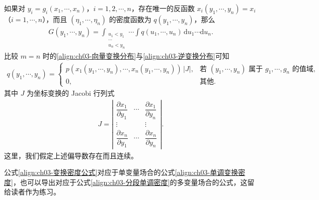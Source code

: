 \documentclass[../../main.tex]{subfiles}
\begin{document}
如果对 $y_i=g_i(x_1,\cdots,x_n)$，$i=1,2,\cdots,n$，存在唯一的反函数 $x_i(y_1,\cdots,y_n)=x_i$（$i=1,\cdots,n$），而且 $(\eta_1,\cdots,\eta_n)$ 的密度函数为 $q(y_1,\cdots,y_n)$，那么
\begin{align}
G(y_1,\cdots,y_n)=\int_{\substack{u_1<y_1\\\cdots\\u_n<y_n}}\cdots\int q(u_1,\cdots,u_n)\,\mathrm{d}u_1\cdots\mathrm{d}u_n.\label{align:ch03-逆变换分布}
\end{align}
比较 $m=n$ 时的\eqref{align:ch03-向量变换分布}与\eqref{align:ch03-逆变换分布}可知
\begin{align}
q(y_1,\cdots,y_n)=
\begin{cases}
p(x_1(y_1,\cdots,y_n),\cdots,x_n(y_1,\cdots,y_n))\,|J|, & \text{若 }(y_1,\cdots,y_n)\text{ 属于 }g_1,\cdots,g_n\text{ 的值域},\\
0, & \text{其他}.
\end{cases}\label{align:ch03-变换密度公式}
\end{align}
其中 $J$ 为坐标变换的 Jacobi 行列式
\begin{align}
J=\left|\begin{array}{ccc}
\dfrac{\partial x_1}{\partial y_1} & \cdots & \dfrac{\partial x_1}{\partial y_n}\\
\vdots & & \vdots\\
\dfrac{\partial x_n}{\partial y_1} & \cdots & \dfrac{\partial x_n}{\partial y_n}
\end{array}\right|.\label{align:ch03-Jacobi}
\end{align}
这里，我们假定上述偏导数存在而且连续。

公式\eqref{align:ch03-变换密度公式}对应于单变量场合的公式\eqref{align:ch03-单调变换密度}，也可以导出对应于公式\eqref{align:ch03-分段单调密度}的多变量场合的公式，这留给读者作为练习。
\end{document}
